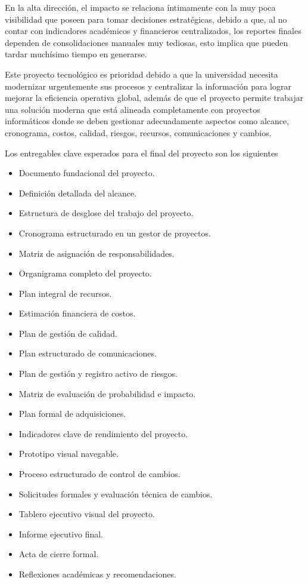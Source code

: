 \documentclass[11pt,spanish]{article}
\begin{document}
En la alta dirección, el impacto se relaciona íntimamente con la muy poca visibilidad que poseen para tomar decisiones estratégicas, debido a que, al no contar con indicadores académicos y financieros centralizados, los reportes finales dependen de consolidaciones manuales muy tediosas, esto implica que pueden tardar muchísimo tiempo en generarse.

Este proyecto tecnológico es prioridad debido a que la universidad necesita modernizar urgentemente sus procesos y centralizar la información para lograr mejorar la eficiencia operativa global, además de que el proyecto permite trabajar una solución moderna que está alineada completamente con proyectos informáticos donde se deben gestionar adecuadamente aspectos como alcance, cronograma, costos, calidad, riesgos, recursos, comunicaciones y cambios.

Los entregables clave esperados para el final del proyecto son los siguientes

\begin{itemize}
    \item Documento fundacional del proyecto.
    \item Definición detallada del alcance.
    \item Estructura de desglose del trabajo del proyecto.
    \item Cronograma estructurado en un gestor de proyectos.
    \item Matriz de asignación de responsabilidades.
    \item Organigrama completo del proyecto.
    \item Plan integral de recursos.
    \item Estimación financiera de costos.
    \item Plan de gestión de calidad.
    \item Plan estructurado de comunicaciones.
    \item Plan de gestión y registro activo de riesgos.
    \item Matriz de evaluación de probabilidad e impacto.
    \item Plan formal de adquisiciones.
    \item Indicadores clave de rendimiento del proyecto.
    \item Prototipo visual navegable.
    \item Proceso estructurado de control de cambios.
    \item Solicitudes formales y evaluación técnica de cambios.
    \item Tablero ejecutivo visual del proyecto.
    \item Informe ejecutivo final.
    \item Acta de cierre formal.
    \item Reflexiones académicas y recomendaciones.
\end{itemize}
\end{document}

